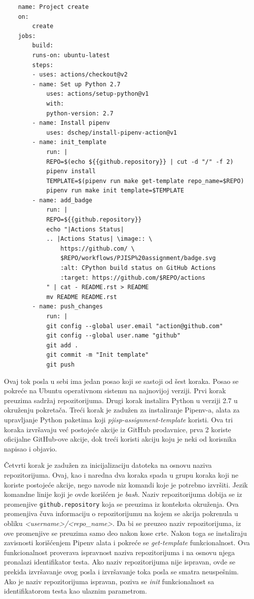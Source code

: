 \documentclass[12pt]{report}
\begin{document}
\begin{verbatim}
    name: Project create
    on:
        create
    jobs:
        build:
        runs-on: ubuntu-latest
        steps:
        - uses: actions/checkout@v2
        - name: Set up Python 2.7
            uses: actions/setup-python@v1
            with:
            python-version: 2.7
        - name: Install pipenv
            uses: dschep/install-pipenv-action@v1
        - name: init_template
            run: |
            REPO=$(echo ${{github.repository}} | cut -d "/" -f 2)
            pipenv install
            TEMPLATE=$(pipenv run make get-template repo_name=$REPO)
            pipenv run make init template=$TEMPLATE
        - name: add_badge
            run: |
            REPO=${{github.repository}}
            echo "|Actions Status|
            .. |Actions Status| \image:: \
                https://github.com/ \
                $REPO/workflows/PJISP%20assignment/badge.svg
                :alt: CPython build status on GitHub Actions
                :target: https://github.com/$REPO/actions
            " | cat - README.rst > README
            mv README README.rst
        - name: push_changes
            run: |
            git config --global user.email "action@github.com"
            git config --global user.name "github"
            git add .
            git commit -m "Init template"
            git push
\end{verbatim}

Ovaj tok posla u sebi ima jedan posao koji se sastoji od šest koraka. Posao se pokreće na Ubuntu operativnom sistemu na najnovijoj verziji. Prvi korak preuzima sadržaj repozitorijuma. Drugi korak instalira Python u verziji 2.7 u okruženju pokretača. Treći korak je zadužen za instaliranje Pipenv-a, alata za upravljanje Python paketima koji \textit{pjisp-assignment-template} koristi. Ova tri koraka izvršavaju već postojeće akcije iz GitHub prodavnice, prva 2 koriste oficijalne GitHub-ove akcije, dok treći koristi akciju koju je neki od korisnika napisao i objavio.

Četvrti korak je zadužen za inicijalizaciju datoteka na osnovu naziva repozitorijuma. Ovaj, kao i naredna dva koraka spada u grupu koraka koji ne koriste postojeće akcije, nego navode niz komandi koje je potrebno izvršiti. Jezik komandne linije koji je ovde korišćen je \textit{bash}. Naziv repozitorijuma dobija se iz promenjive \texttt{github.repository} koja se preuzima iz konteksta okruženja. Ova promenjiva čuva informaciju o repozitorijumu na kojem se akcija pokrenula u obliku \textit{<username>/<repo\_name>}. Da bi se preuzeo naziv repozitorijuma, iz ove promenjive se preuzima samo deo nakon kose crte. Nakon toga se instaliraju zavisnosti korišćenjem Pipenv alata i pokreće se \textit{get-template} funkcionalnost. Ova funkcionalnost proverava ispravnost naziva repozitorijuma i na osnovu njega pronalazi identifikator testa. Ako naziv repozitorijuma nije ispravan, ovde se prekida izvršavanje ovog posla i izvršavanje toka posla se smatra neuspešnim. Ako je naziv repozitorijuma ispravan, poziva se \textit{init} funkcionalnost sa identifikatorom testa kao ulaznim parametrom.
\end{document}

